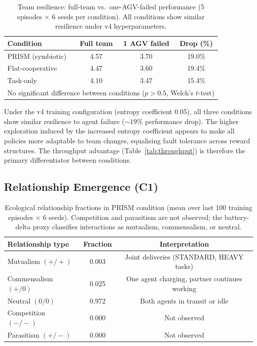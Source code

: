 \documentclass[Afour,sageh,times]{sagej}
\begin{document}
\begin{table}[htbp]
\centering
\caption{Team resilience: full-team vs.\ one-AGV-failed performance (5 episodes $\times$ 6 seeds per condition). All conditions show similar resilience under v4 hyperparameters.}
\label{tab:resilience}
\begin{tabular}{lccc}
\toprule
\textbf{Condition} & \textbf{Full team} & \textbf{1 AGV failed} & \textbf{Drop (\%)} \\
\midrule
PRISM (symbiotic)  & 4.57 & 3.70 & 19.0\% \\
Flat-cooperative   & 4.47 & 3.60 & 19.4\% \\
Task-only          & 4.10 & 3.47 & 15.4\% \\
\bottomrule
\multicolumn{4}{l}{\small No significant difference between conditions ($p{>}0.5$, Welch's $t$-test)} \\
\end{tabular}
\end{table}

Under the v4 training configuration (entropy coefficient 0.05), all three conditions show similar resilience to agent failure (${\sim}19\%$ performance drop). The higher exploration induced by the increased entropy coefficient appears to make all policies more adaptable to team changes, equalising fault tolerance across reward structures. The throughput advantage (Table~\ref{tab:throughput}) is therefore the primary differentiator between conditions.

\subsection{Relationship Emergence (C1)}

\begin{table}[htbp]
\centering
\caption{Ecological relationship fractions in PRISM condition (mean over last 100 training episodes $\times$ 6 seeds). Competition and parasitism are not observed; the battery-delta proxy classifies interactions as mutualism, commensalism, or neutral.}
\label{tab:relationships}
\begin{tabular}{lcc}
\toprule
\textbf{Relationship type} & \textbf{Fraction} & \textbf{Interpretation} \\
\midrule
Mutualism $(+/+)$    & 0.003 & Joint deliveries (STANDARD, HEAVY tasks) \\
Commensalism $(+/0)$ & 0.025 & One agent charging, partner continues working \\
Neutral $(0/0)$      & 0.972 & Both agents in transit or idle \\
Competition $(-/-)$  & 0.000 & Not observed \\
Parasitism $(+/-)$   & 0.000 & Not observed \\
\bottomrule
\end{tabular}
\end{table}
\end{document}
